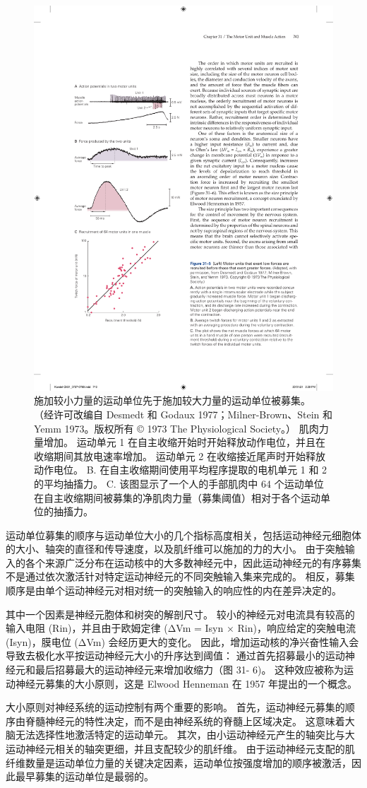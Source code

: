 \begin{figure}[htbp]
	\centering
	\includegraphics[width=0.5\linewidth]{chap31/fig_31_5}
	\caption{施加较小力量的运动单位先于施加较大力量的运动单位被募集。 （经许可改编自 Desmedt 和 Godaux 1977；Milner-Brown、Stein 和 Yemm 1973。版权所有 © 1973 The Physiological Society。） 肌肉力量增加。 运动单元 1 在自主收缩开始时开始释放动作电位，并且在收缩期间其放电速率增加。 运动单元 2 在收缩接近尾声时开始释放动作电位。 B. 在自主收缩期间使用平均程序提取的电机单元 1 和 2 的平均抽搐力。 C. 该图显示了一个人的手部肌肉中 64 个运动单位在自主收缩期间被募集的净肌肉力量（募集阈值）相对于各个运动单位的抽搐力。}
	\label{fig:31_5}
\end{figure}


运动单位募集的顺序与运动单位大小的几个指标高度相关，包括运动神经元细胞体的大小、轴突的直径和传导速度，以及肌纤维可以施加的力的大小。
由于突触输入的各个来源广泛分布在运动核中的大多数神经元中，因此运动神经元的有序募集不是通过依次激活针对特定运动神经元的不同突触输入集来完成的。
相反，募集顺序是由单个运动神经元对相对统一的突触输入的响应性的内在差异决定的。


其中一个因素是神经元胞体和树突的解剖尺寸。
较小的神经元对电流具有较高的输入电阻 (Rin)，并且由于欧姆定律 (ΔVm = Isyn × Rin)，响应给定的突触电流 (Isyn)，膜电位 (ΔVm) 会经历更大的变化。
因此，增加运动核的净兴奋性输入会导致去极化水平按运动神经元大小的升序达到阈值：
通过首先招募最小的运动神经元和最后招募最大的运动神经元来增加收缩力（图 31- 6)。
这种效应被称为运动神经元募集的大小原则，这是 Elwood Henneman 在 1957 年提出的一个概念。


大小原则对神经系统的运动控制有两个重要的影响。
首先，运动神经元募集的顺序由脊髓神经元的特性决定，而不是由神经系统的脊髓上区域决定。
这意味着大脑无法选择性地激活特定的运动单元。
其次，由小运动神经元产生的轴突比与大运动神经元相关的轴突更细，并且支配较少的肌纤维。
由于运动神经元支配的肌纤维数量是运动单位力量的关键决定因素，运动单位按强度增加的顺序被激活，因此最早募集的运动单位是最弱的。


